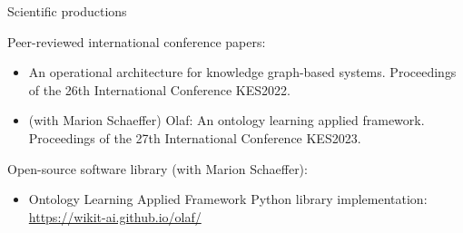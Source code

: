 \begin{frame}{Scientific productions}

    Peer-reviewed international conference papers:
    \begin{itemize}
        \item An operational architecture for knowledge graph-based systems. Proceedings of the 26th International Conference KES2022.
        \item (with Marion Schaeffer) Olaf: An ontology learning applied framework. Proceedings of the 27th International Conference KES2023.
    \end{itemize}

    Open-source software library (with Marion Schaeffer):
    \begin{itemize}
        \item Ontology Learning Applied Framework Python library implementation:\\\href{https://wikit-ai.github.io/olaf/}{https://wikit-ai.github.io/olaf/}
    \end{itemize}

\end{frame}